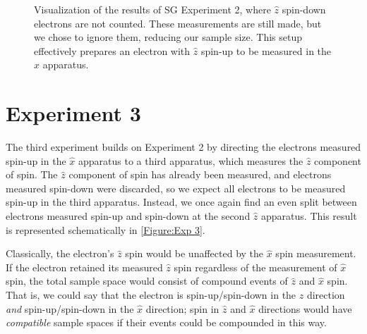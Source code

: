 \begin{figure}[!t]
\centering\CaptionFontSize
{}

\caption[Re-normalized results of Stern-Gerlach Experiment 2]
{Visualization of the results of SG Experiment 2, where $\hat{z}$ spin-down electrons are not counted. These measurements are still made, but we chose to ignore them, reducing our sample size. This setup effectively prepares an electron with $\hat{z}$ spin-up to be measured in the $\hat{x}$ apparatus.}
\label{Figure:Exp 2 renormalized}
\end{figure}

\section{Experiment 3}
The third experiment builds on Experiment 2 by directing the electrons measured spin-up in the $\hat{x}$ apparatus to a third apparatus, which measures the $\hat{z}$ component of spin. The $\hat{z}$ component of spin has already been measured, and electrons measured spin-down were discarded, so we expect all electrons to be measured spin-up in the third apparatus. Instead, we once again find an even split between electrons measured spin-up and spin-down at the second $\hat{z}$ apparatus. This result is represented schematically in \autoref{Figure:Exp 3}.

Classically, the electron's $\hat{z}$ spin would be unaffected by the $\hat{x}$ spin measurement. If the electron retained its measured $\hat{z}$ spin regardless of the measurement of $\hat{x}$ spin, the total sample space would consist of compound events of $\hat{z}$ and $\hat{x}$ spin. That is, we could say that the electron is spin-up/spin-down in the $\hat{z}$ direction \textit{and} spin-up/spin-down in the $\hat{x}$ direction; spin in $\hat{z}$ and $\hat{x}$ directions would have \textit{compatible} sample spaces if their events could be compounded in this way.

